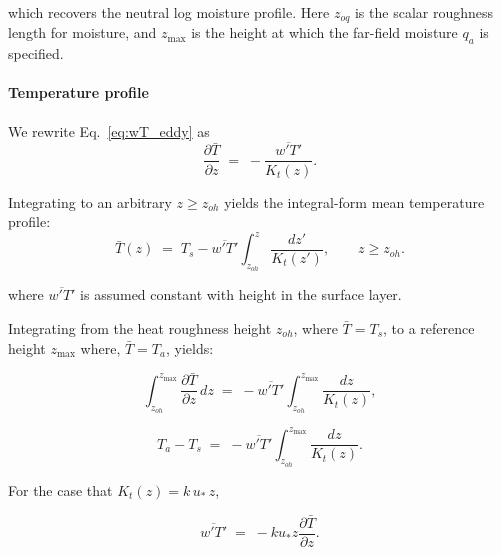 \documentclass{article}
\begin{document}
    which recovers the  neutral log moisture profile. Here $z_{oq}$ is the scalar roughness length for moisture, and $z_{\max}$ is the height at which the far-field moisture $q_a$ is specified.
    
    
    
    \paragraph{Temperature profile}
    
     We rewrite Eq.~\eqref{eq:wT_eddy} as
    \begin{equation}
    \frac{\partial \bar T}{\partial z}
    \;=\;
    -\frac{\overline{w'T'}}{K_t(z)}.
    \end{equation}
    
    
    Integrating to an arbitrary  $z\ge z_{oh}$ yields the integral-form mean temperature profile:
    \begin{equation}
    \bar T(z)
    \;=\;
    T_s
    -\overline{w'T'}\int_{z_{oh}}^{z}\frac{dz'}{K_t(z')},
    \qquad z\ge z_{oh}.
    \label{eq:T_profile_general}
    \end{equation}
    
    where $\overline{w'T'}$ is assumed constant with height in the surface layer. 
    
    
    Integrating from the heat roughness height $z_{oh}$, where $\bar T=T_s$, to a reference height $z_{\max}$ where, $\bar T=T_a$, yields: 
    
    \begin{equation}
    \int_{z_{oh}}^{z_{\max}}\frac{\partial \bar T}{\partial z}\,dz
    \;=\;
    -\overline{w'T'}\int_{z_{oh}}^{z_{\max}}\frac{dz}{K_t(z)},
    \end{equation}
    
    \begin{equation}
    T_a - T_s
    \;=\;
    -\overline{w'T'}\int_{z_{oh}}^{z_{\max}}\frac{dz}{K_t(z)}.
    \label{eq:Ta_minus_Ts_general}
    \end{equation}
    
    For the case that $K_t(z)=k\,u_*\,z$, 
    
    \begin{equation}
    \overline{w'T'} \;=\; -k u_* z\frac{\partial \bar T}{\partial z}.
    \label{eq:wT_eddy}
    \end{equation}
    
\end{document}
